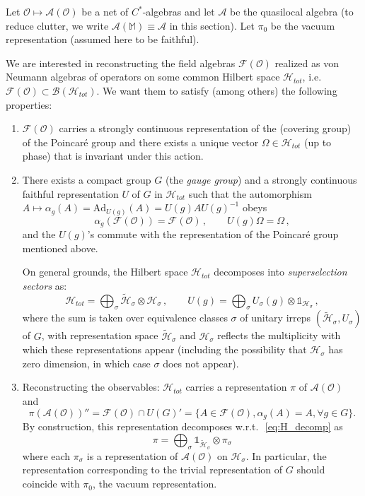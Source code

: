 \documentclass[12pt,a4paper]{article}
\newcommand{\1}{\mathds{1}}                         %
\newcommand{\M}{\mathbb{M}} 	     %
\newcommand{\Hcal}{\mathcal {H}}
\newcommand{\Bcal}{\mathcal {B}}
\newcommand{\F}{\mathcal{F}}
\newcommand{\Ocal}{\mathcal{O}}
\newcommand{\II}{{\mathbb{1}}}
\newcommand{\Ac}{{\mathcal{A}}}
\newcommand{\Fc}{{\mathcal{F}}}
\begin{document}
Let $\Ocal\mapsto \Ac(\Ocal)$ be a net of $C^*$-algebras
and let $\Ac$ be the quasilocal algebra (to reduce clutter, we write $\Ac(\M)\equiv \Ac$ in this section). Let $\pi_0$ be the vacuum representation (assumed here to be faithful).

We are interested in reconstructing the field algebras $\F(\Ocal)$ realized as von Neumann algebras of operators on some common Hilbert space $\Hcal_{tot}$, i.e. $\F(\Ocal)\subset \Bcal(\Hcal_{tot})$. We want them to satisfy (among others) the following properties:
	\begin{enumerate}[label=\bf F\arabic{enumi},leftmargin=*,widest=4] 
	\item $\F(\Ocal)$ carries a strongly continuous representation of the (covering group) of the Poincar\'e group and there exists a unique vector $\Omega\in \Hcal_{tot}$ (up to  phase) that is invariant under this action.
	\item There exists a compact group $G$ (the \textit{gauge group}) and a strongly continuous faithful representation $U$ of $G$ in  $\Hcal_{tot}$ such that the automorphism $A\mapsto \alpha_g(A)= \mathrm{Ad}_{U(g)}(A)=U(g)A U(g)^{-1}$ obeys
\[
	\alpha_g(\F(\Ocal))=\F(\Ocal)\,,\qquad U(g)\Omega=\Omega\,,
\]
	and the $U(g)$'s commute with the representation of the Poincar\'e group mentioned above.
	
	On general grounds, the Hilbert space $\Hcal_{tot}$ decomposes into \textit{superselection sectors} as:
	\begin{equation}\label{eq:H_decomp}
	\Hcal_{tot}=\bigoplus_\sigma \tilde{\Hcal}_\sigma\otimes \Hcal_\sigma\,,\qquad
	U(g) = \bigoplus_\sigma  U_\sigma(g)\otimes \II_{{\Hcal}_\sigma}\,,
	\end{equation}
	where the sum is taken over equivalence classes $\sigma$ of unitary irreps $(\tilde{\Hcal}_\sigma,U_\sigma)$ of $G$, with representation space $\tilde{\Hcal}_\sigma$ and $\Hcal_\sigma$ reflects the multiplicity with which these representations appear (including the possibility that  $\Hcal_\sigma$ has zero dimension, in which case $\sigma$ does not appear).
	
	\item Reconstructing the observables: $\Hcal_{tot}$ carries a representation $\pi$ of $\Ac(\Ocal)$ and
	\[
	\pi(\Ac(\Ocal))''=\Fc(\Ocal)\cap U(G)' =\{A\in\F(\Ocal), \alpha_g(A)=A, \forall g\in G\}.
	\]
	By construction, this representation decomposes w.r.t.\,~\eqref{eq:H_decomp} as
	\[
	\pi = \bigoplus_\sigma  \II_{\tilde{\Hcal}_\sigma}\otimes \pi_\sigma
	\]
	where each $\pi_\sigma$ is a representation of $\Ac(\Ocal)$ on $\Hcal_\sigma$.
	In particular, the representation corresponding to the trivial representation of $G$ should coincide with $\pi_0$, the vacuum representation.  
\end{enumerate}
\end{document}
